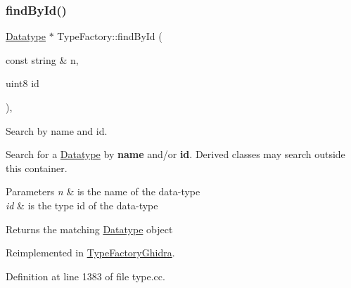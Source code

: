 \subsubsection{\texorpdfstring{findById()}{findById()}}
{\footnotesize\ttfamily \mbox{\hyperlink{class_datatype}{Datatype}} $\ast$ Type\+Factory\+::find\+By\+Id (\begin{DoxyParamCaption}\item[{const string \&}]{n,  }\item[{uint8}]{id }\end{DoxyParamCaption})\hspace{0.3cm}{\ttfamily [protected]}, {\ttfamily [virtual]}}



Search by name and id. 

Search for a \mbox{\hyperlink{class_datatype}{Datatype}} by {\bfseries{name}} and/or {\bfseries{id}}. Derived classes may search outside this container. 
\begin{DoxyParams}{Parameters}
{\em n} & is the name of the data-\/type \\
\hline
{\em id} & is the type id of the data-\/type \\
\hline
\end{DoxyParams}
\begin{DoxyReturn}{Returns}
the matching \mbox{\hyperlink{class_datatype}{Datatype}} object 
\end{DoxyReturn}


Reimplemented in \mbox{\hyperlink{class_type_factory_ghidra_a494fd9c2fb18db1b1f9ee4d7078d590c}{Type\+Factory\+Ghidra}}.



Definition at line 1383 of file type.\+cc.

